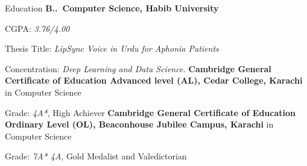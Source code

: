\begin{rubric}{Education}
\entry*[2020 -- Present]%
	\textbf{B..~Computer Science, Habib University}\par
        CGPA: \emph{3.76/4.00} \par
        Thesis Title: \emph{LipSync Voice in Urdu for Aphonia Patients}
        \par Concentration: \emph{Deep Learning and Data Science.}
\entry*[2018 -- 2020]%
	\textbf{Cambridge General Certificate of Education Advanced level (AL), Cedar College, Karachi} in Computer Science
	\par Grade: \emph{4A*}, High Achiever
\entry*[2015 -- 2018]%
	\textbf{Cambridge General Certificate of Education Ordinary Level (OL), Beaconhouse Jubilee Campus, Karachi} in Computer Science
	\par Grade: \emph{7A* 4A}, Gold Medalist and Valedictorian

% 
\end{rubric}